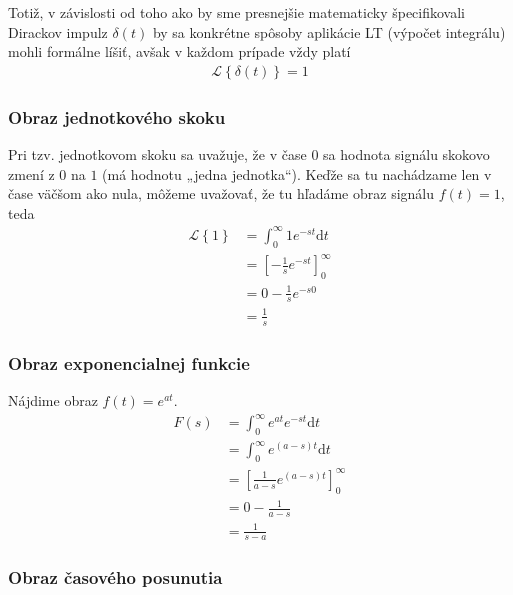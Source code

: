 \documentclass[a4paper, 10pt, ]{article}
\begin{document}
Totiž, v závislosti od toho ako by sme presnejšie matematicky špecifikovali Dirackov impulz $\delta(t)$ by sa konkrétne spôsoby aplikácie LT (výpočet integrálu) mohli formálne líšiť, avšak v každom prípade vždy platí
\begin{align}
    \mathcal L \left\{ \delta(t) \right\} = 1
\end{align}





\subsubsection{Obraz jednotkového skoku}
Pri tzv. jednotkovom skoku sa uvažuje, že v čase $0$ sa hodnota signálu skokovo zmení z $0$ na $1$ (má hodnotu „jedna jednotka“). Keďže sa tu nachádzame len v čase väčšom ako nula, môžeme uvažovať, že tu hľadáme obraz signálu $f(t) = 1$, teda
\begin{equation}
    \begin{aligned}
        \mathcal L \left\{ 1 \right\} &= \int_0^\infty 1 e^{-st}\text{d}t \\
        &= \left[ - \frac{1}{s} e^{-st} \right]_0^\infty \\
        &= 0 - \frac{1}{s} e^{-s0} \\
        &= \frac{1}{s}
    \end{aligned}
\end{equation}



\subsubsection{Obraz exponencialnej funkcie}
\label{vyhlcast}

Nájdime obraz $f(t) = e^{at}$.
\begin{equation}
    \begin{aligned}
        F(s) &= \int_0^\infty e^{at} e^{-st}\text{d}t \\
        &= \int_0^\infty e^{(a-s)t}\text{d}t \\
        &= \left[ \frac{1}{a-s} e^{(a-s)t} \right]_0^\infty \\
        &= 0 - \frac{1}{a-s} \\
        &= \frac{1}{s - a}
    \end{aligned}
\end{equation}




\subsubsection{Obraz časového posunutia}
\end{document}
